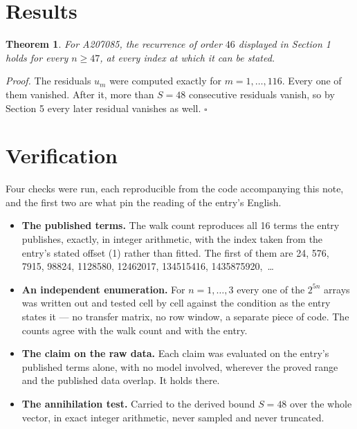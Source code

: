 \documentclass[11pt]{article}
\newtheorem{theorem}{Theorem}
\theoremstyle{definition}
\begin{document}
\section{Results}

\begin{theorem} For A207085, the recurrence of order $46$ displayed in Section 1 holds for every $n \ge 47$, at every index at which it can be stated.\end{theorem}

{\itshape Proof.} The residuals $u_m$ were computed exactly for $m = 1,\dots,116$. Every one of them vanished. After it, more than $S = 48$ consecutive residuals vanish, so by Section 5 every later residual vanishes as well. $\square$

\section{Verification}

Four checks were run, each reproducible from the code accompanying this note, and the first two are what pin the reading of the entry's English.

\begin{itemize}

\item {\bfseries The published terms.} The walk count reproduces all 16 terms the entry publishes, exactly, in integer arithmetic, with the index taken from the entry's stated offset (1) rather than fitted. The first of them are 24, 576, 7915, 98824, 1128580, 12462017, 134515416, 1435875920,~\dots

\item {\bfseries An independent enumeration.} For $n = 1,\dots,3$ every one of the $2^{5n}$ arrays was written out and tested cell by cell against the condition as the entry states it --- no transfer matrix, no row window, a separate piece of code. The counts agree with the walk count and with the entry.

\item {\bfseries The claim on the raw data.} Each claim was evaluated on the entry's published terms alone, with no model involved, wherever the proved range and the published data overlap. It holds there.

\item {\bfseries The annihilation test.} Carried to the derived bound $S = 48$ over the whole vector, in exact integer arithmetic, never sampled and never truncated.

\end{itemize}
\end{document}
